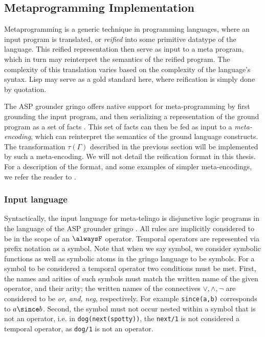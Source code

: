 \subsection{Metaprogramming Implementation}

Metaprogramming is a generic technique in programming languages, where
an input program is translated, or \emph{reified} into some primitive
datatype of the language. This reified representation then serve as
input to a meta program, which in turn may reinterpret the semantics
of the reified program. The complexity of this translation varies
based on the complexity of the language's syntax. Lisp may serve as a
gold standard here, where reification is simply done by quotation. 

The ASP grounder gringo offers native support for meta-programming by
first grounding the input program, and then serializing a
representation of the ground program as a set of facts
\cite{karoscwa21a}. This set of facts can then be fed as input to a
\emph{meta-encoding}, which can reinterpret the semantics of the
ground language constructs. The transformation $\tau(\Gamma)$
described in the previous section will be implemented by such a
meta-encoding. We will not detail the reification format in this
thesis. For a description of the format, and some examples of simpler
meta-encodings, we refer the reader to \cite{karoscwa21a}.

\subsubsection{Input language}

Syntactically, the input language for meta-telingo is disjunctive
logic programs in the language of the ASP grounder gringo
\cite{PotasscoUserGuide19} \cite{gescth07a}. All rules are implicitly
considered to be in the scope of an $\alwaysF$ operator. Temporal
operators are represented via prefix notation as a symbol. Note that
when we say symbol, we consider symbolic functions as well as symbolic
atoms in the gringo language to be symbols. For a symbol to be
considered a temporal operator two conditions must be met. First, the
names and arities of such symbols must match the written name of the
given operator, and their arity; the written names of the connectives
$\vee, \wedge, \neg$ are considered to be \emph{or, and, neg},
respectively. For example \verb|since(a,b)| corresponds to
$a \since b$. Second, the symbol must not occur nested within a symbol
that is not an operator, i.e. in \verb|dog(next(spotty))|, the
\verb|next/1| is not considered a temporal operator, as \verb|dog/1|
is not an operator.


